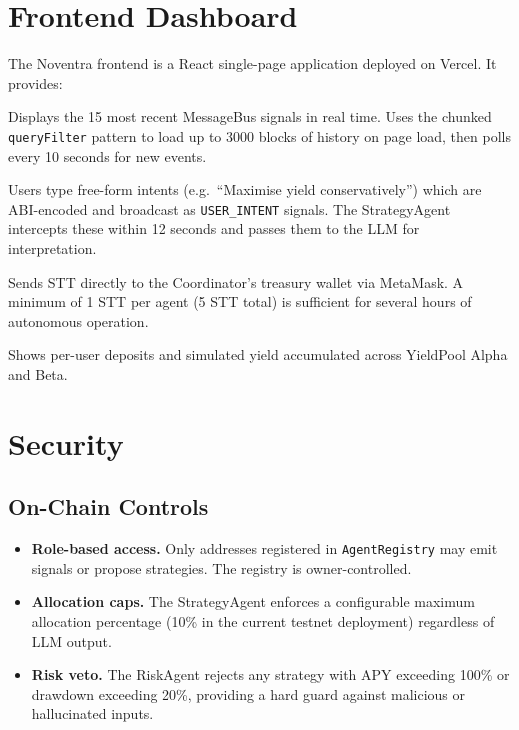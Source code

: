 \documentclass[11pt,a4paper]{article}
\begin{document}
\section{Frontend Dashboard}

The Noventra frontend is a React single-page application deployed on Vercel. It provides:

\begin{description}[leftmargin=1.8em, style=nextline]
  \item[Live Agent Terminal.]
    Displays the 15 most recent MessageBus signals in real time. Uses the chunked
    \texttt{queryFilter} pattern to load up to 3000 blocks of history on page load, then
    polls every 10 seconds for new events.

  \item[Natural Language Intent Submission.]
    Users type free-form intents (e.g.\ ``Maximise yield conservatively'') which are
    ABI-encoded and broadcast as \texttt{USER\_INTENT} signals. The StrategyAgent intercepts
    these within 12 seconds and passes them to the LLM for interpretation.

  \item[Fund Swarm.]
    Sends STT directly to the Coordinator's treasury wallet via MetaMask. A minimum of 1 STT
    per agent (5 STT total) is sufficient for several hours of autonomous operation.

  \item[Portfolio View.]
    Shows per-user deposits and simulated yield accumulated across YieldPool Alpha and Beta.
\end{description}

\section{Security}

\subsection{On-Chain Controls}

\begin{itemize}[leftmargin=1.8em]
  \item \textbf{Role-based access.} Only addresses registered in \texttt{AgentRegistry} may
        emit signals or propose strategies. The registry is owner-controlled.
  \item \textbf{Allocation caps.} The StrategyAgent enforces a configurable maximum allocation
        percentage (10\% in the current testnet deployment) regardless of LLM output.
  \item \textbf{Risk veto.} The RiskAgent rejects any strategy with APY exceeding 100\% or
        drawdown exceeding 20\%, providing a hard guard against malicious or hallucinated inputs.
\end{itemize}
\end{document}
